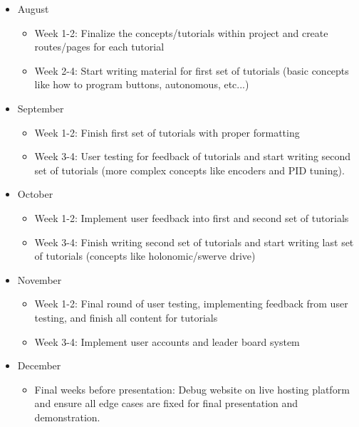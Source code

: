 \documentclass[10pt,twocolumn]{article}
\begin{document}
\begin{itemize}
    \item August
    \begin{itemize}
        \item Week 1-2: Finalize the concepts/tutorials within project and create routes/pages for each tutorial
        \item Week 2-4: Start writing material for first set of tutorials (basic concepts like how to program buttons, autonomous, etc...)
    \end{itemize}
    \item September
    \begin{itemize}
        \item Week 1-2: Finish first set of tutorials with proper formatting
        \item Week 3-4: User testing for feedback of tutorials and start writing second set of tutorials (more complex concepts like encoders and PID tuning).
    \end{itemize}
    \item October
    \begin{itemize}
        \item Week 1-2: Implement user feedback into first and second set of tutorials
        \item Week 3-4: Finish writing second set of tutorials and start writing last set of tutorials (concepts like holonomic/swerve drive)
    \end{itemize}
    \item November
    \begin{itemize}
        \item Week 1-2: Final round of user testing, implementing feedback from user testing, and finish all content for tutorials
        \item Week 3-4: Implement user accounts and leader board system
    \end{itemize}
    \item December
    \begin{itemize}
        \item Final weeks before presentation: Debug website on live hosting platform and ensure all edge cases are fixed for final presentation and demonstration.
    \end{itemize}

\end{itemize}
 
\end{document}
